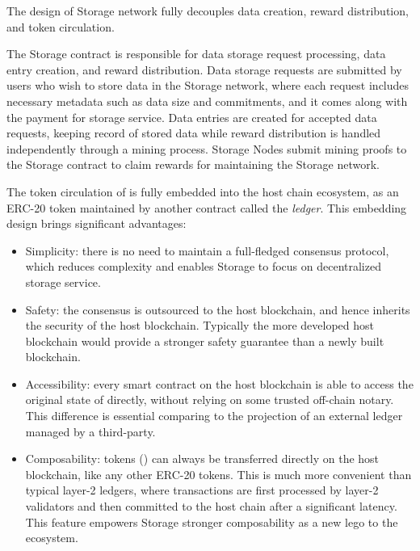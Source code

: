 The design of \projabbrev Storage network fully decouples data creation, reward distribution, and token circulation.

The \projabbrev Storage contract is responsible for data storage request processing, data entry creation, and reward distribution. 
Data storage requests are submitted by users who wish to store data in the \projabbrev Storage network,
where each request includes necessary metadata such as data size and commitments,
and it comes along with the payment for storage service.
Data entries are created for accepted data requests, keeping record of stored data while
reward distribution is handled independently through a mining process.
Storage Nodes submit mining proofs to the \projabbrev Storage contract to claim rewards for maintaining the \projabbrev Storage network.


The token circulation of \projabbrev is fully embedded into the host chain ecosystem,
as an ERC-20 token maintained by another contract called the \emph{\token ledger}.
% 
This embedding design brings significant advantages:
\begin{itemize}
	\item Simplicity: there is no need to maintain a full-fledged  consensus protocol,
	which reduces complexity and enables \projabbrev Storage to focus on decentralized storage service.

	\item Safety: the consensus is outsourced to the host blockchain, and hence inherits the security of the host blockchain. 
	Typically the more developed host blockchain would provide a stronger safety guarantee than a newly built blockchain.

	\item Accessibility: every smart contract on the host blockchain is able to access the original state of \project directly, without relying on some trusted off-chain notary. This difference is essential comparing to the projection of an external ledger managed by a third-party.

	\item Composability: \projabbrev tokens (\token) can always be transferred directly on the host blockchain, like any other ERC-20 tokens. 
	This is much more convenient than typical layer-2 ledgers, where transactions are first processed by layer-2 validators and then committed to the host chain after a significant latency.
	This feature empowers \projabbrev Storage stronger composability as a new lego to the ecosystem.
\end{itemize}


